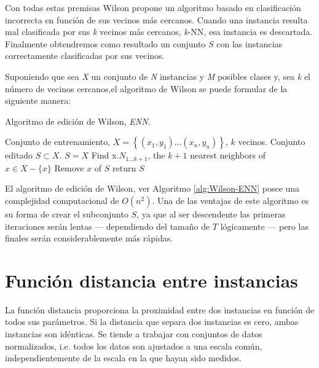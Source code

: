 Con todas estas premisas Wilson propone un algoritmo basado en clasificación incorrecta en función de sus vecinos más cercanos. Cuando una instancia resulta mal clasificada por sus \textit{k} vecinos más cercanos, \textit{k}-NN, esa instancia es descartada. Finalmente obtendremos como resultado un conjunto $S$ con las instancias correctamente clasificadas por sus vecinos.

Suponiendo que sea \textit{X} un conjunto de \textit{N} instancias y \textit{M} posibles clases y, sea \textit{k} el número de vecinos cercanos,el algoritmo de Wilson se puede formular de la siguiente manera:

\begin{algorithm}
\caption{Algoritmo de edición de Wilson, \textit{ENN}.}\label{alg:Wilson-ENN}
\begin{algorithmic}[1]
\Require Conjunto de entrenamiento, $X=\left\{(x_1,y_1)...(x_n,y_n)\right\}$, $k$ vecinos.
\Ensure Conjunto editado $S \subset X$.
\Statex
{}
	\State $S=X$
		\State Find x.$N_{1...k+1}$, the $k+1$ nearest neighbors of $x \in X - \{x\}$
			\State Remove $x$ of $S$
		\EndIf
	\EndFor
	\State return $S$
\EndProcedure
\end{algorithmic}
\end{algorithm}

El algoritmo de edición de Wilson, ver Algoritmo \ref{alg:Wilson-ENN} posee una complejidad computacional de $O(n^2)$. Una de las ventajas de este algoritmo es su forma de crear el subconjunto $S$, ya que al ser descendente las primeras iteraciones serán lentas --- dependiendo del tamaño de $T$ lógicamente --- pero las finales serán considerablemente más rápidas.

\newpage
\section{Función distancia entre instancias}
La función distancia proporciona la proximidad entre dos instancias en función de todos sus parámetros. Si la distancia que separa dos instancias es cero, ambas instancias son idénticas. Se tiende a trabajar con conjuntos de datos normalizados, i.e. todos los datos son ajustados a una escala común, independientemente de la escala en la que hayan sido medidos.

